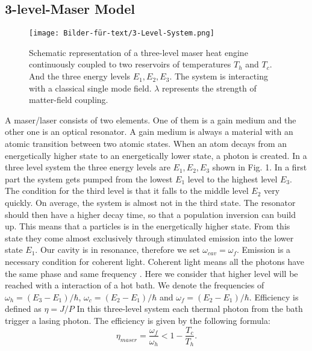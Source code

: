 \documentclass[12pt,a4paper]{article}
\begin{document}
\subsection{3-level-Maser Model}
\begin{figure}[h!] 
\texttt{[image: Bilder-für-text/3-Level-System.png]}
\caption{Schematic representation of a three-level maser heat engine
continuously coupled to two reservoirs of temperatures $T_h$ and
$T_c$. And the three energy levels $E_1,E_2,E_3$. The
system is interacting with a classical single mode field. $\lambda$
represents the strength of matter-field coupling.}
\end{figure}
A maser/laser consists of two elements. One of them is a gain medium and the other one is an optical resonator. A gain medium is always a material with an atomic transition between two atomic states. When an atom decays from an energetically higher state to an energetically lower state, a photon is created.
In a three level system the three energy levels are $E_1,E_2,E_3$ shown in Fig. 1. In a first part the system gets pumped from the lowest $E_1$ level to the highest level $ E_3$. The condition for the third level is that it falls to the middle level $ E_2$ very quickly. On average, the system is almost not in the third state. The resonator should then have a higher decay time, so that a population inversion can build up. This means that a particles is in the energetically higher state. From this state they come almost exclusively through stimulated emission into the lower state $ E_1$.  Our cavity is in  resonance, therefore we set $\omega_{cav}=\omega_f$.
Emission is a necessary condition for coherent light. Coherent light means all the photons have the same phase and same frequency \cite{Li2017}.
Here we consider that higher level will be reached with a interaction of a hot bath.  
We denote the frequencies of $\omega_h=(E_3-E_1)/\hbar$, $\omega_c=(E_2-E_1)/\hbar$ and $\omega_f=(E_2-E_1)/\hbar$.
Efficiency is defined as $\eta=J/P $
In this three-level system each thermal photon from the bath trigger a lasing photon. 
The efficiency is given by the following formula:
\begin{equation}
\eta_{maser}=\frac{\omega_f}{\omega_h}<1-\frac{T_c}{T_h}.
\end{equation}
\end{document}
